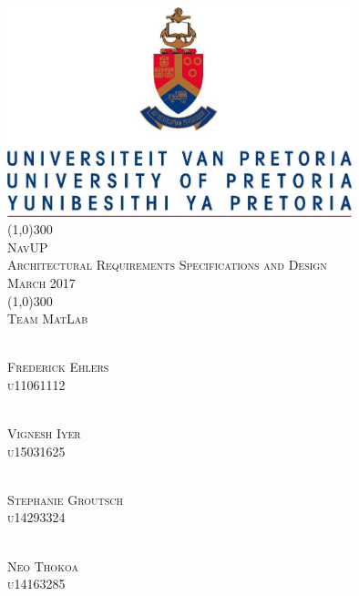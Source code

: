 \documentclass[runningheads,a4paper]{article}
\begin{document}
	\begin{titlepage}
		\begin{center}
			\includegraphics[width=10cm]{UP.jpg}  \\
			[1cm]
			\line(1,0){300} \\
			[0.3cm]
			\textsc{\Large
				NavUP \\
				Architectural Requirements Specifications and Design \\
			\hfill {} March 2017
			}\\
			[0.1cm]
			\line(1,0){300} \\
			[0.7cm]
			\textsc{\Large
				Team MatLab
			} \\
			
			
			
		\end{center}
		
		\begin{center}
			\begin{multicols}{2}
				\textsc{\large\\
				Frederick Ehlers\\ 
					u11061112\\ 
				}
				
				\textsc{\large\\
				Vignesh Iyer\\
					 u15031625\\ 
				}
				
				\textsc{\large\\
		        Stephanie Groutsch\\
				 	u14293324\\ 
				}
				
				\textsc{\large\\
					Neo Thokoa\\
					u14163285\\
				}
				
				\columnbreak
				

\end{multicols}
\end{center}
\end{titlepage}
\end{document}
